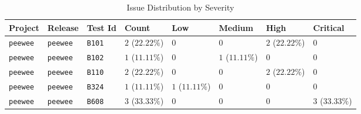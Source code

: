 \begin{table}
\caption{Issue Distribution by Severity}
\label{tab:issue-distribution}
\begin{tabular}{llllllll}
\toprule
Project & Release & Test Id & Count & Low & Medium & High & Critical \\
\midrule
\texttt{peewee} & \texttt{peewee} & \texttt{B101} & $2$ ($22.22\%$) & $0$ & $0$ & $2$ ($22.22\%$) & $0$ \\
\texttt{peewee} & \texttt{peewee} & \texttt{B102} & $1$ ($11.11\%$) & $0$ & $1$ ($11.11\%$) & $0$ & $0$ \\
\texttt{peewee} & \texttt{peewee} & \texttt{B110} & $2$ ($22.22\%$) & $0$ & $0$ & $2$ ($22.22\%$) & $0$ \\
\texttt{peewee} & \texttt{peewee} & \texttt{B324} & $1$ ($11.11\%$) & $1$ ($11.11\%$) & $0$ & $0$ & $0$ \\
\texttt{peewee} & \texttt{peewee} & \texttt{B608} & $3$ ($33.33\%$) & $0$ & $0$ & $0$ & $3$ ($33.33\%$) \\
\bottomrule
\end{tabular}
\end{table}

